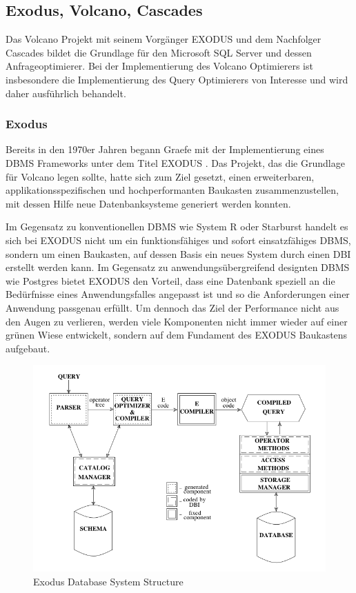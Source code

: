 \subsection{Exodus, Volcano, Cascades}

Das Volcano Projekt mit seinem Vorgänger \ac{EXODUS} und dem Nachfolger Cascades bildet die Grundlage für den Microsoft SQL Server und dessen Anfrageoptimierer. Bei der Implementierung des Volcano Optimierers ist insbesondere die Implementierung des Query Optimierers von Interesse und wird daher ausführlich behandelt.

\subsubsection{Exodus}


Bereits in den 1970er Jahren begann Graefe mit der Implementierung eines DBMS Frameworks unter dem Titel EXODUS \cite{carey1990exodus}.  Das Projekt, das die Grundlage für Volcano legen sollte, hatte sich zum Ziel gesetzt, einen erweiterbaren, applikationsspezifischen und hochperformanten Baukasten zusammenzustellen, mit dessen Hilfe neue Datenbanksysteme generiert werden konnten. 

Im Gegensatz zu konventionellen DBMS wie System R oder Starburst handelt es sich bei EXODUS nicht um ein funktionsfähiges und sofort einsatzfähiges DBMS, sondern um einen Baukasten, auf dessen Basis ein neues System durch einen \ac{DBI} erstellt werden kann. Im Gegensatz zu anwendungsübergreifend designten DBMS wie Postgres bietet EXODUS den Vorteil, dass eine Datenbank speziell an die Bedürfnisse eines Anwendungsfalles angepasst ist und so die Anforderungen einer Anwendung passgenau erfüllt. Um dennoch das Ziel der Performance nicht aus den Augen zu verlieren, werden viele Komponenten nicht immer wieder auf einer grünen Wiese entwickelt, sondern auf dem Fundament des EXODUS Baukastens aufgebaut.

\begin{figure}[ht]
  \centering
  \includegraphics[width=\textwidth]{02_Related_Work/ExodusDatabaseSystemStructure.png}
  \caption{Exodus Database System Structure}
  \label{ExodusDatabaseStructure}
\end{figure}

